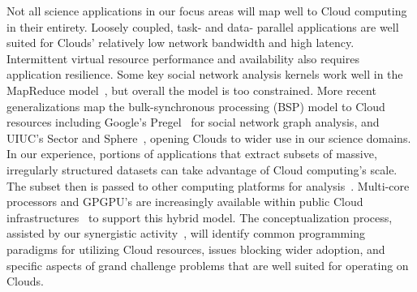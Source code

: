 Not all science applications in our focus areas will map well to Cloud computing in their entirety.
Loosely coupled, task- and data- parallel applications are well suited for Clouds’ relatively low
network bandwidth and high latency. 
Intermittent virtual resource performance and availability
also requires application resilience. 
Some key social network analysis kernels work well in the
MapReduce model~\cite{conf/icdm/KangTF09}, but overall the model is too constrained. 
More recent generalizations map
the bulk-synchronous processing (BSP) model to Cloud resources including Google’s Pregel~\cite{conf/spaa/MalewiczABDHLC09}
for social network graph analysis, and UIUC’s Sector and Sphere~\cite{conf/spaa/MalewiczABDHLC09,oai:arXiv.org:0808.3019}, 
opening Clouds to wider use in our science domains. 
In our experience, portions of applications that extract subsets of
massive, irregularly structured datasets can take advantage of Cloud computing’s scale. 
The subset
then is passed to other computing platforms for analysis~\cite{Cloud.hybrid}. Multi-core processors and GPGPU's are
increasingly available within public Cloud
infrastructures~\cite{AmazonGPU} to support this hybrid model.
The conceptualization process, assisted by our synergistic activity~\cite{prasanna:cic:pillcrow}, will identify common
programming paradigms for utilizing Cloud resources, issues blocking wider adoption, and specific
aspects of grand challenge problems that are well suited for operating on Clouds.
